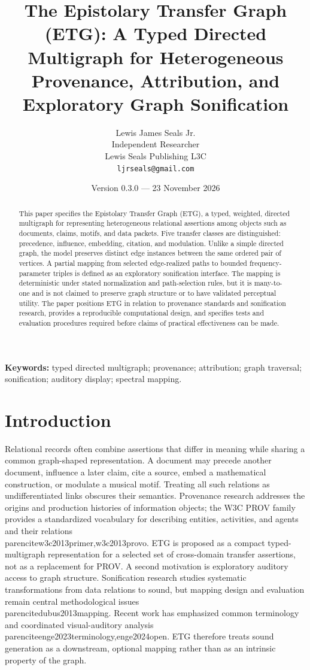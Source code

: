 \documentclass[11pt]{article}
\title{The Epistolary Transfer Graph (ETG): A Typed Directed Multigraph for Heterogeneous Provenance, Attribution, and Exploratory Graph Sonification}
\author{Lewis James Seals Jr.\\Independent Researcher\\Lewis Seals Publishing L3C\\\texttt{ljrseals@gmail.com}}
\date{Version 0.3.0 --- 23 November 2026}
\begin{document}
\maketitle
\begin{abstract}
This paper specifies the Epistolary Transfer Graph (ETG), a typed, weighted, directed multigraph for representing heterogeneous relational assertions among objects such as documents, claims, motifs, and data packets. Five transfer classes are distinguished: precedence, influence, embedding, citation, and modulation. Unlike a simple directed graph, the model preserves distinct edge instances between the same ordered pair of vertices. A partial mapping from selected edge-realized paths to bounded frequency-parameter triples is defined as an exploratory sonification interface. The mapping is deterministic under stated normalization and path-selection rules, but it is many-to-one and is not claimed to preserve graph structure or to have validated perceptual utility. The paper positions ETG in relation to provenance standards and sonification research, provides a reproducible computational design, and specifies tests and evaluation procedures required before claims of practical effectiveness can be made.
\end{abstract}
\noindent\textbf{Keywords:} typed directed multigraph; provenance; attribution; graph traversal; sonification; auditory display; spectral mapping.
\section{Introduction}
Relational records often combine assertions that differ in meaning while sharing a common graph-shaped representation. A document may precede another document, influence a later claim, cite a source, embed a mathematical construction, or modulate a musical motif. Treating all such relations as undifferentiated links obscures their semantics. Provenance research addresses the origins and production histories of information objects; the W3C PROV family provides a standardized vocabulary for describing entities, activities, and agents and their relations \\parencite{w3c2013primer,w3c2013provo}. ETG is proposed as a compact typed-multigraph representation for a selected set of cross-domain transfer assertions, not as a replacement for PROV.
A second motivation is exploratory auditory access to graph structure. Sonification research studies systematic transformations from data relations to sound, but mapping design and evaluation remain central methodological issues \\parencite{dubus2013mapping}. Recent work has emphasized common terminology and coordinated visual-auditory analysis \\parencite{enge2023terminology,enge2024open}. ETG therefore treats sound generation as a downstream, optional mapping rather than as an intrinsic property of the graph.
\end{document}
